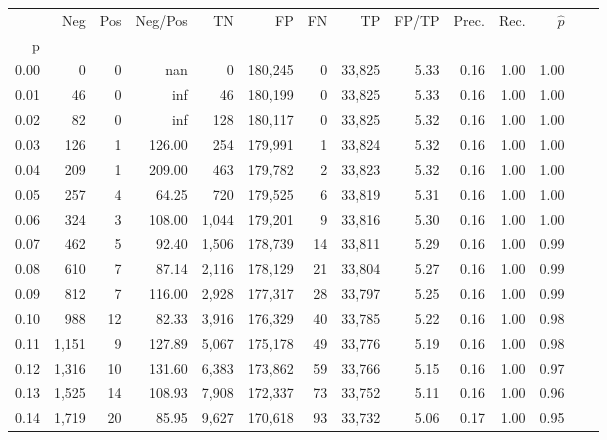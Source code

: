 \begin{tabular}{rrrrrrrrrrrrrr}
\toprule
{} &    Neg &  Pos & Neg/Pos &       TN &       FP &      FN &      TP & FP/TP & Prec. &  Rec. & $\hat{p}$ \\
p    &        &      &         &          &          &         &         &       &       &       &           \\
\midrule
0.00 &      0 &    0 &     nan &        0 &  180,245 &       0 &  33,825 &  5.33 &  0.16 &  1.00 &      1.00 \\
0.01 &     46 &    0 &     inf &       46 &  180,199 &       0 &  33,825 &  5.33 &  0.16 &  1.00 &      1.00 \\
0.02 &     82 &    0 &     inf &      128 &  180,117 &       0 &  33,825 &  5.32 &  0.16 &  1.00 &      1.00 \\
0.03 &    126 &    1 &  126.00 &      254 &  179,991 &       1 &  33,824 &  5.32 &  0.16 &  1.00 &      1.00 \\
0.04 &    209 &    1 &  209.00 &      463 &  179,782 &       2 &  33,823 &  5.32 &  0.16 &  1.00 &      1.00 \\
0.05 &    257 &    4 &   64.25 &      720 &  179,525 &       6 &  33,819 &  5.31 &  0.16 &  1.00 &      1.00 \\
0.06 &    324 &    3 &  108.00 &    1,044 &  179,201 &       9 &  33,816 &  5.30 &  0.16 &  1.00 &      1.00 \\
0.07 &    462 &    5 &   92.40 &    1,506 &  178,739 &      14 &  33,811 &  5.29 &  0.16 &  1.00 &      0.99 \\
0.08 &    610 &    7 &   87.14 &    2,116 &  178,129 &      21 &  33,804 &  5.27 &  0.16 &  1.00 &      0.99 \\
0.09 &    812 &    7 &  116.00 &    2,928 &  177,317 &      28 &  33,797 &  5.25 &  0.16 &  1.00 &      0.99 \\
0.10 &    988 &   12 &   82.33 &    3,916 &  176,329 &      40 &  33,785 &  5.22 &  0.16 &  1.00 &      0.98 \\
0.11 &  1,151 &    9 &  127.89 &    5,067 &  175,178 &      49 &  33,776 &  5.19 &  0.16 &  1.00 &      0.98 \\
0.12 &  1,316 &   10 &  131.60 &    6,383 &  173,862 &      59 &  33,766 &  5.15 &  0.16 &  1.00 &      0.97 \\
0.13 &  1,525 &   14 &  108.93 &    7,908 &  172,337 &      73 &  33,752 &  5.11 &  0.16 &  1.00 &      0.96 \\
0.14 &  1,719 &   20 &   85.95 &    9,627 &  170,618 &      93 &  33,732 &  5.06 &  0.17 &  1.00 &      0.95 \\

\end{tabular}
